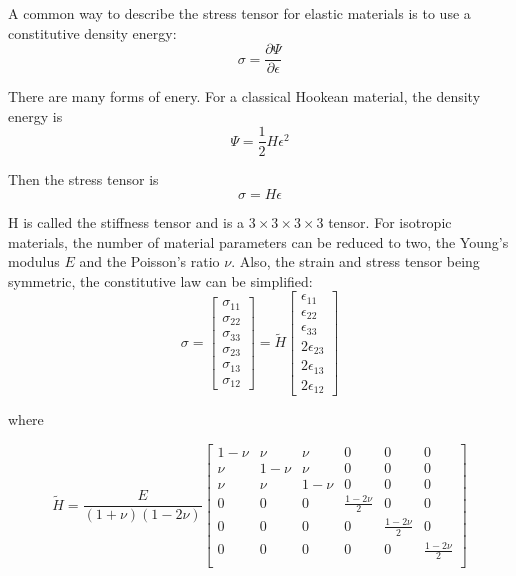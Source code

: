 \documentclass[11pt, oneside, a4paper]{memoir}
\begin{document}
A common way to describe the stress tensor for elastic materials is to use a constitutive density energy:
\begin{equation}
\sigma = \frac{\partial \Psi}{\partial \epsilon}
\end{equation}

There are many forms of enery. For a classical Hookean material, the density energy is
\begin{equation}
\Psi = \frac{1}{2}H\epsilon^{2}
\end{equation}

Then the stress tensor is
\begin{equation}
\sigma = H\epsilon
\end{equation}

H is called the stiffness tensor and is a $3\times3\times3\times3$ tensor. For isotropic materials, the number of material parameters can be reduced to two, the Young's modulus $E$ and the Poisson's ratio $\nu$. Also, the strain and stress tensor being symmetric, the constitutive law can be simplified:
\begin{equation}
\sigma = 
\begin{bmatrix}
\sigma_{11} \\
\sigma_{22} \\
\sigma_{33} \\
\sigma_{23} \\
\sigma_{13} \\
\sigma_{12}
\end{bmatrix}
=
\tilde{H}
\begin{bmatrix}
\epsilon_{11} \\
\epsilon_{22} \\
\epsilon_{33} \\
2\epsilon_{23} \\
2\epsilon_{13} \\
2\epsilon_{12}
\end{bmatrix}
\end{equation}

where

\begin{equation}
\tilde{H} =
\frac{E}{\left(1+\nu\right)\left(1-2\nu\right)}
\begin{bmatrix}
1-\nu & \nu & \nu & 0 & 0 & 0 \\ 
\nu & 1-\nu & \nu & 0 & 0 & 0 \\
\nu & \nu & 1-\nu & 0 & 0 & 0 \\
0 & 0 & 0 & \frac{1-2\nu}{2} & 0 & 0 \\
0 & 0 & 0 & 0 & \frac{1-2\nu}{2} & 0 \\
0 & 0 & 0 & 0 & 0 & \frac{1-2\nu}{2} \\
\end{bmatrix}
\end{equation}
\end{document}
